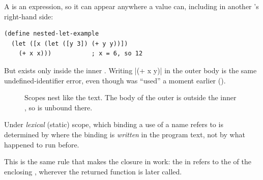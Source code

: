 A  is an expression, so it can appear anywhere a value can, including in another 's right-hand side:
\begin{lstlisting}
(define nested-let-example
  (let ([x (let ([y 3]) (+ y y))])
    (+ x x)))           ; x = 6, so 12
\end{lstlisting}
But  exists only inside the inner . Writing \rkt|(+ x y)| in the outer body is the same undefined-identifier error, even though  was ``used'' a moment earlier ().

\begin{figure}[htbp]
\centering
{}
\caption{Scopes nest like the text. The body of the outer  is outside the inner , so  is unbound there.}
\label{fig:scope}
\end{figure}

\begin{definition}
Under \emph{lexical} (static) scope, which binding a use of a name refers to is determined by where the binding is \emph{written} in the program text, not by what happened to run before.
\end{definition}

This is the same rule that makes the closure in  work: the  in  refers to the  of the enclosing , wherever the returned function is later called.

